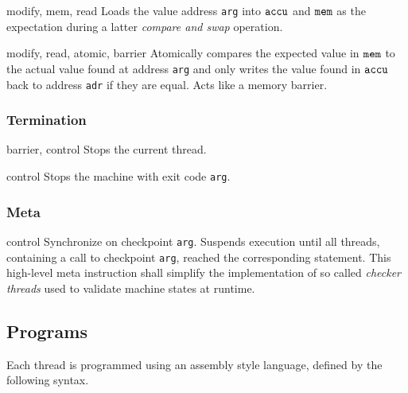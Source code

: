 
{}
{modify, mem, read}
{Loads the value  address \texttt{arg} into $\texttt{accu}$ and $\texttt{mem}$ as the expectation during a latter \emph{compare and swap} operation.}

{}
{modify, read, atomic, barrier}
{Atomically compares the expected value in $\texttt{mem}$ to the actual value found at address \texttt{arg} and only writes the value found in $\texttt{accu}$ back to address \texttt{adr} if they are equal.
Acts like a memory barrier.}

\subsubsection*{Termination}


{}
{barrier, control}
{Stops the current thread.}

{}
{control}
{Stops the machine with exit code \texttt{arg}.}

\subsubsection*{Meta}

{}
{control}
{Synchronize on checkpoint \texttt{arg}.
Suspends execution until all threads, containing a call to checkpoint \texttt{arg}, reached the corresponding  statement.
This high-level meta instruction shall simplify the implementation of so called \emph{checker threads} used to validate machine states at runtime.}

\newpage

\subsection{Programs}

Each thread is programmed using an assembly style language, defined by the following syntax.

